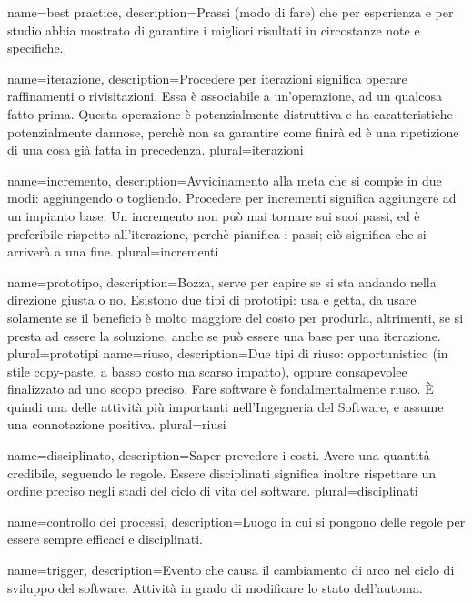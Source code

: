 {
name=best practice,
description={Prassi (modo di fare) che per esperienza e per studio abbia mostrato di garantire i migliori risultati in circostanze note e specifiche.}
}

{
name=iterazione,
description={Procedere per iterazioni significa operare raffinamenti o rivisitazioni. Essa \`e associabile a un'operazione, ad un qualcosa fatto prima. Questa operazione \`e potenzialmente distruttiva e ha caratteristiche potenzialmente dannose, perch\`e non sa garantire come finir\`a ed \`e una ripetizione di una cosa gi\`a fatta in precedenza.}
plural=iterazioni
}

{
name=incremento,
description={Avvicinamento alla meta che si compie in due modi: aggiungendo o togliendo. Procedere per incrementi significa aggiungere ad un impianto base. Un incremento non pu\`o mai tornare sui suoi passi, ed \`e preferibile rispetto all'iterazione, perch\`e pianifica i passi; ci\`o significa che si arriver\`a a una fine.}
plural=incrementi
}

{
name=prototipo,
description={Bozza, serve per capire se si sta andando nella direzione giusta o no. Esistono due tipi di prototipi: usa e getta, da usare solamente se il beneficio \`e molto maggiore del costo per produrla, altrimenti, se si presta ad essere la soluzione, anche se pu\`o essere una base per una iterazione.}
plural=prototipi
}
{
name=riuso,
description={Due tipi di riuso: opportunistico (in stile copy-paste, a basso costo ma scarso impatto), oppure consapevolee finalizzato ad uno scopo preciso. Fare software \`e fondalmentalmente riuso. \`E quindi una delle attivit\`a pi\`u importanti nell'Ingegneria del Software, e assume una connotazione positiva.}
plural=riusi
}

{
name=disciplinato,
description={Saper prevedere i costi. Avere una quantit\`a credibile, seguendo le regole. Essere disciplinati significa inoltre rispettare un ordine preciso negli stadi del ciclo di vita del software.}
plural=disciplinati
}

{
name=controllo dei processi,
description={Luogo in cui si pongono delle regole per essere sempre efficaci e disciplinati.}
}

{
name=trigger,
description={Evento che causa il cambiamento di arco nel ciclo di sviluppo del software. Attivit\`a in grado di modificare lo stato dell'automa.}
}

